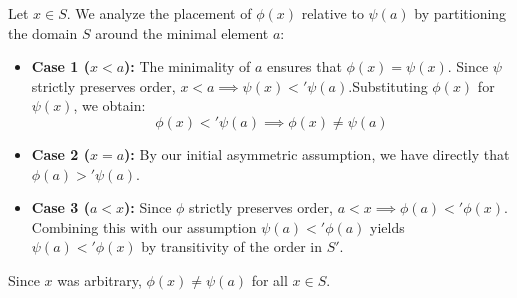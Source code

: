 Let $x\in S$. We analyze the placement of $\phi(x)$ relative to $\psi(a)$ by partitioning the domain $S$ around the minimal element $a$:
\begin{itemize}
    \item \textbf{Case 1 ($x < a$):} The minimality of $a$ ensures that $\phi(x)=\psi(x)$. Since $\psi$ strictly preserves order, $x < a \implies \psi(x) <' \psi(a)$.Substituting $\phi(x)$ for $\psi(x)$, we obtain:$$\phi(x) <' \psi(a) \implies \phi(x) \neq \psi(a)$$ 
    \item \textbf{Case 2 ($x = a$):} By our initial asymmetric assumption, we have directly that $\phi(a) >' \psi(a)$.
    \item \textbf{Case 3 ($a < x$):} Since $\phi$ strictly preserves order, $a < x \implies \phi(a) <' \phi(x)$. Combining this with our assumption $\psi(a) <' \phi(a)$ yields $\psi(a) <' \phi(x) $ by transitivity of the order in $S'$.
\end{itemize}
Since $x$ was arbitrary, $\phi(x) \neq \psi(a)$ for all $x \in S$.

